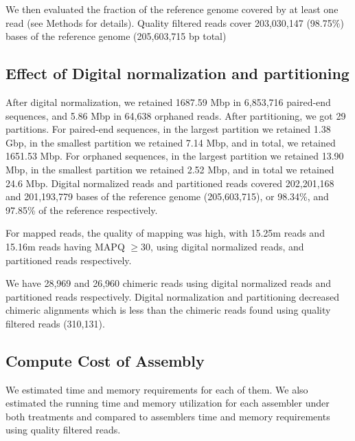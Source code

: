 We then evaluated the fraction of the reference genome covered by at
least one read (see Methods for details). Quality filtered
reads cover 203,030,147 (98.75\%) bases of the reference genome
(205,603,715 bp total)


\subsection *{Effect of Digital normalization and partitioning} 

After digital normalization, we retained 
1687.59 Mbp in 6,853,716 paired-end sequences, and 5.86 Mbp in 64,638 orphaned reads. 
 After partitioning, we
got 29 partitions.  For paired-end sequences, in the largest partition we retained %
1.38 Gbp, in the smallest partition we retained 7.14 Mbp, and in total,  we retained 1651.53
Mbp.  For orphaned sequences, in the largest partition we retained 13.90
Mbp, in the smallest partition we retained 2.52 Mbp, and in total we retained 24.6 Mbp.  
Digital normalized reads and partitioned reads covered 
202,201,168 and 201,193,779  bases of the reference genome (205,603,715), or 98.34\%, and 97.85\% of the reference respectively.

For mapped reads, the quality of mapping was high, with 15.25m reads  and 15.16m reads having MAPQ $\geq 30$, using digital
normalized reads, and partitioned reads respectively.

We have 28,969 and 26,960 chimeric
reads using digital normalized reads and partitioned reads
respectively. Digital normalization and partitioning decreased
chimeric alignments which is less than the chimeric reads found using quality filtered reads (310,131). %

\subsection*{Compute Cost of Assembly} 
We estimated time and memory requirements for each of them. We also estimated the running time and memory utilization for each assembler under both treatments and compared to assemblers time and memory requirements using quality filtered reads.  

